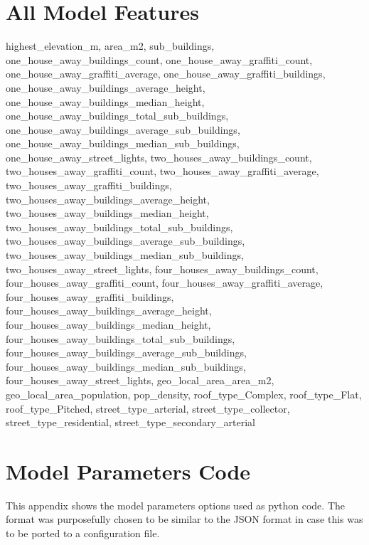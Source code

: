 \chapter{All Model Features}\label{app:all_model_features}

highest\_elevation\_m, area\_m2, sub\_buildings, one\_house\_away\_buildings\_count, one\_house\_away\_graffiti\_count, one\_house\_away\_graffiti\_average, one\_house\_away\_graffiti\_buildings, one\_house\_away\_buildings\_average\_height, one\_house\_away\_buildings\_median\_height, one\_house\_away\_buildings\_total\_sub\_buildings, one\_house\_away\_buildings\_average\_sub\_buildings, one\_house\_away\_buildings\_median\_sub\_buildings, one\_house\_away\_street\_lights, two\_houses\_away\_buildings\_count, two\_houses\_away\_graffiti\_count, two\_houses\_away\_graffiti\_average, two\_houses\_away\_graffiti\_buildings, two\_houses\_away\_buildings\_average\_height, two\_houses\_away\_buildings\_median\_height, two\_houses\_away\_buildings\_total\_sub\_buildings, two\_houses\_away\_buildings\_average\_sub\_buildings, two\_houses\_away\_buildings\_median\_sub\_buildings, two\_houses\_away\_street\_lights, four\_houses\_away\_buildings\_count, four\_houses\_away\_graffiti\_count, four\_houses\_away\_graffiti\_average, four\_houses\_away\_graffiti\_buildings, four\_houses\_away\_buildings\_average\_height, four\_houses\_away\_buildings\_median\_height, four\_houses\_away\_buildings\_total\_sub\_buildings, four\_houses\_away\_buildings\_average\_sub\_buildings, four\_houses\_away\_buildings\_median\_sub\_buildings, four\_houses\_away\_street\_lights, geo\_local\_area\_area\_m2, geo\_local\_area\_population, pop\_density, roof\_type\_Complex, roof\_type\_Flat, roof\_type\_Pitched, street\_type\_arterial, street\_type\_collector, street\_type\_residential, street\_type\_secondary\_arterial

\chapter{Model Parameters Code}\label{app:model_parameters}

This appendix shows the model parameters options used as python code. The format was purposefully chosen to be similar to the JSON format in case this was to be ported to a configuration file.

